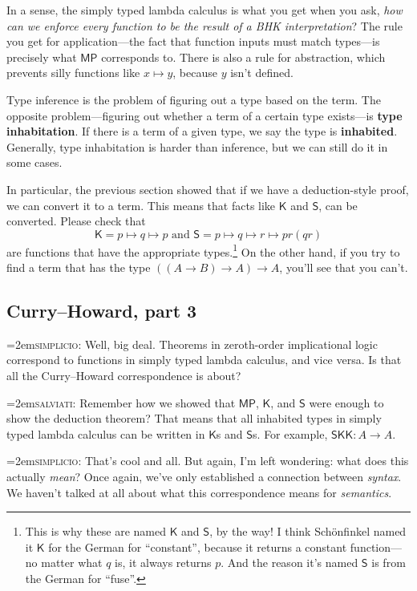 \documentclass[11pt,paper=letter]{scrartcl}
\newcommand{\sf}{\mathsf}
\newcommand{\simp}{\vspace{0.5em}\noindent\hangindent=2em\textsc{simplicio:} }
\newcommand{\salv}{\vspace{0.5em}\noindent\hangindent=2em\textsc{salviati:} }
\begin{document}
In a sense, the simply typed lambda calculus is what you get when you ask, \emph{how can we enforce every function to be the result of a BHK interpretation}? The rule you get for application---the fact that function inputs must match types---is precisely what $\sf{MP}$ corresponds to. There is also a rule for abstraction, which prevents silly functions like $x \mapsto y$, because $y$ isn't defined.

Type inference is the problem of figuring out a type based on the term. The opposite problem---figuring out whether a term of a certain type exists---is \textbf{type inhabitation}. If there is a term of a given type, we say the type is \textbf{inhabited}. Generally, type inhabitation is harder than inference, but we can still do it in some cases.

In particular, the previous section showed that if we have a deduction-style proof, we can convert it to a term. This means that facts like $\sf{K}$ and $\sf{S}$, can be converted. Please check that \[
  \sf{K} = p \mapsto q \mapsto p
  \text{ and }
  \sf{S} = p \mapsto q \mapsto r \mapsto pr(qr)
\]
are functions that have the appropriate types.\footnote{This is why these are named $\sf{K}$ and $\sf{S}$, by the way! I think Schönfinkel named it $\sf{K}$ for the German for ``constant'', because it returns a constant function---no matter what $q$ is, it always returns $p$. And the reason it's named $\sf{S}$ is from the German for ``fuse''.} On the other hand, if you try to find a term that has the type $((A \to B) \to A) \to A$, you'll see that you can't.

\subsection{Curry--Howard, part 3}

\simp Well, big deal. Theorems in zeroth-order implicational logic correspond to functions in simply typed lambda calculus, and vice versa. Is that all the Curry--Howard correspondence is about?

\salv Remember how we showed that $\sf{MP}$, $\sf{K}$, and $\sf{S}$ were enough to show the deduction theorem? That means that all inhabited types in simply typed lambda calculus can be written in $\sf{K}$s and $\sf{S}$s. For example, $\sf{S}\sf{K}\sf{K} : A \to A$.

\simp That's cool and all. But again, I'm left wondering: what does this actually \emph{mean}? Once again, we've only established a connection between \emph{syntax}. We haven't talked at all about what this correspondence means for \emph{semantics}.
\end{document}
